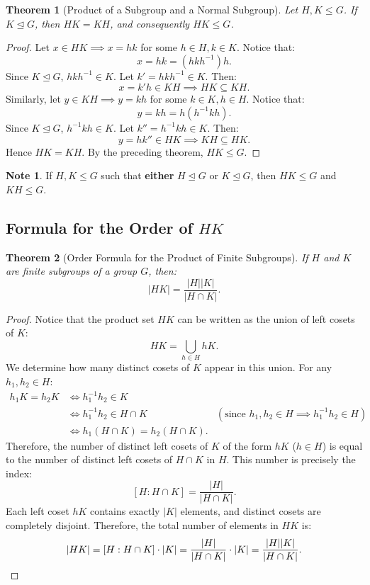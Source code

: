 \documentclass[12pt]{article}
\theoremstyle{definition}
\newtheorem*{note}{Note}
\theoremstyle{plain}
\newtheorem{theorem}{Theorem}[section]
\begin{document}
\begin{theorem}[Product of a Subgroup and a Normal Subgroup]
Let $H, K \le G$. If $K \trianglelefteq G$, then $HK = KH$, and consequently $HK \le G$.
\end{theorem}

\begin{proof}
Let $x \in HK \implies x = hk$ for some $h \in H, k \in K$.
Notice that:
\[
x = hk = (h k h^{-1}) h.
\]
Since $K \trianglelefteq G$, $h k h^{-1} \in K$. Let $k' = h k h^{-1} \in K$. Then:
\[
x = k' h \in KH \implies HK \subseteq KH.
\]
Similarly, let $y \in KH \implies y = kh$ for some $k \in K, h \in H$.
Notice that:
\[
y = kh = h (h^{-1} k h).
\]
Since $K \trianglelefteq G$, $h^{-1} k h \in K$. Let $k'' = h^{-1} k h \in K$. Then:
\[
y = h k'' \in HK \implies KH \subseteq HK.
\]
Hence $HK = KH$. By the preceding theorem, $HK \le G$.
\end{proof}

\begin{note}
If $H, K \le G$ such that \textbf{either} $H \trianglelefteq G$ or $K \trianglelefteq G$, then $HK \le G$ and $KH \le G$.
\end{note}

\subsection{Formula for the Order of \texorpdfstring{$HK$}{HK}}

\begin{theorem}[Order Formula for the Product of Finite Subgroups]
If $H$ and $K$ are finite subgroups of a group $G$, then:
\[
|HK| = \frac{|H||K|}{|H \cap K|}.
\]
\end{theorem}

\begin{proof}
Notice that the product set $HK$ can be written as the union of left cosets of $K$:
\[
HK = \bigcup_{h \in H} hK.
\]
We determine how many distinct cosets of $K$ appear in this union.
For any $h_1, h_2 \in H$:
\begin{align*}
h_1 K = h_2 K &\iff h_1^{-1} h_2 \in K \\
&\iff h_1^{-1} h_2 \in H \cap K & (\text{since } h_1, h_2 \in H \implies h_1^{-1}h_2 \in H) \\
&\iff h_1 (H \cap K) = h_2 (H \cap K).
\end{align*}
Therefore, the number of distinct left cosets of $K$ of the form $hK$ ($h \in H$) is equal to the number of distinct left cosets of $H \cap K$ in $H$.
This number is precisely the index:
\[
[H : H \cap K] = \frac{|H|}{|H \cap K|}.
\]
Each left coset $hK$ contains exactly $|K|$ elements, and distinct cosets are completely disjoint.
Therefore, the total number of elements in $HK$ is:
\[
|HK| = [H : H \cap K] \cdot |K| = \frac{|H|}{|H \cap K|} \cdot |K| = \frac{|H||K|}{|H \cap K|}. \qedhere
\]
\end{proof}
\end{document}
